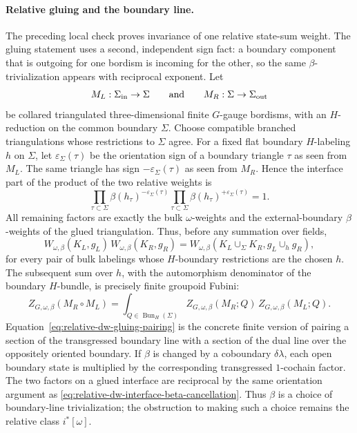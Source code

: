 \paragraph{Relative gluing and the boundary line.}
The preceding local check proves invariance of one relative state-sum weight.
The gluing statement uses a second, independent sign fact: a boundary component
that is outgoing for one bordism is incoming for the other, so the same
\(\beta\)-trivialization appears with reciprocal exponent.  Let
\[
  M_L:\Sigma_{\rm in}\to \Sigma
  \qquad\hbox{and}\qquad
  M_R:\Sigma\to \Sigma_{\rm out}
\]
be collared triangulated three-dimensional finite \(G\)-gauge bordisms, with
an \(H\)-reduction on the common boundary \(\Sigma\).  Choose compatible
branched triangulations whose restrictions to \(\Sigma\) agree.  For a fixed
flat boundary \(H\)-labeling \(h\) on \(\Sigma\), let
\(\varepsilon_\Sigma(\tau)\) be the orientation sign of a boundary triangle
\(\tau\) as seen from \(M_L\).  The same triangle has sign
\(-\varepsilon_\Sigma(\tau)\) as seen from \(M_R\).  Hence the interface
part of the product of the two relative weights is
\begin{equation}
  \prod_{\tau\subset\Sigma}
  \beta(h_\tau)^{-\varepsilon_\Sigma(\tau)}
  \prod_{\tau\subset\Sigma}
  \beta(h_\tau)^{+\varepsilon_\Sigma(\tau)}
  =
  1.
  \label{eq:relative-dw-interface-beta-cancellation}
\end{equation}
All remaining factors are exactly the bulk \(\omega\)-weights and the
external-boundary \(\beta\)-weights of the glued triangulation.  Thus, before
any summation over fields,
\begin{equation}
  W_{\omega,\beta}(K_L,g_L)\,
  W_{\omega,\beta}(K_R,g_R)
  =
  W_{\omega,\beta}(K_L\cup_\Sigma K_R,g_L\cup_h g_R),
  \label{eq:relative-dw-pointwise-gluing-weight}
\end{equation}
for every pair of bulk labelings whose \(H\)-boundary restrictions are the
chosen \(h\).  The subsequent sum over \(h\), with the automorphism
denominator of the boundary \(H\)-bundle, is precisely finite groupoid
Fubini:
\begin{equation}
  Z_{G,\omega,\beta}(M_R\circ M_L)
  =
  \int_{Q\in\operatorname{Bun}_H(\Sigma)}
  Z_{G,\omega,\beta}(M_R;Q)\,
  Z_{G,\omega,\beta}(M_L;Q).
  \label{eq:relative-dw-gluing-pairing}
\end{equation}
Equation~\eqref{eq:relative-dw-gluing-pairing} is the concrete finite version
of pairing a section of the transgressed boundary line with a section of the
dual line over the oppositely oriented boundary.  If \(\beta\) is changed by a
coboundary \(\delta\lambda\), each open boundary state is multiplied by the
corresponding transgressed \(1\)-cochain factor.  The two factors on a glued
interface are reciprocal by the same orientation argument as
\eqref{eq:relative-dw-interface-beta-cancellation}.  Thus \(\beta\) is a
choice of boundary-line trivialization; the obstruction to making such a
choice remains the relative class \(i^*[\omega]\).


